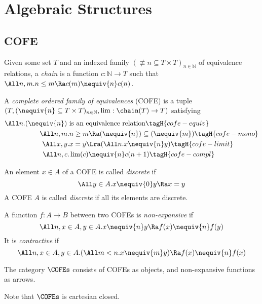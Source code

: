 \section{Algebraic Structures}

\subsection{COFE}

\begin{defn}[Chain]
  Given some set $T$ and an indexed family $({\nequiv{n}} \subseteq T \times T)_{n \in \mathbb{N}}$ of equivalence relations, a \emph{chain} is a function $c : \mathbb{N} \to T$ such that $\All n, m. n \leq m \Ra c (m) \nequiv{n} c (n)$.
\end{defn}

\begin{defn}
  A \emph{complete ordered family of equivalences} (COFE) is a tuple $(T, ({\nequiv{n}} \subseteq T \times T)_{n \in \mathbb{N}}, \lim : \chain(T) \to T)$ satisfying
  \begin{align*}
    \All n. (\nequiv{n}) ~& \text{is an equivalence relation} \tagH{cofe-equiv} \\
    \All n, m.& n \geq m \Ra (\nequiv{n}) \subseteq (\nequiv{m}) \tagH{cofe-mono} \\
    \All x, y.& x = y \Lra (\All n. x \nequiv{n} y) \tagH{cofe-limit} \\
    \All n, c.& \lim(c) \nequiv{n} c(n+1) \tagH{cofe-compl}
  \end{align*}
\end{defn}


\begin{defn}
  An element $x \in A$ of a COFE is called \emph{discrete} if
  \[ \All y \in A. x \nequiv{0} y \Ra x = y\]
  A COFE $A$ is called \emph{discrete} if all its elements are discrete.
\end{defn}

\begin{defn}
  A function $f : A \to B$ between two COFEs is \emph{non-expansive} if
  \[\All n, x \in A, y \in A. x \nequiv{n} y \Ra f(x) \nequiv{n} f(y) \]
  It is \emph{contractive} if
  \[ \All n, x \in A, y \in A. (\All m < n. x \nequiv{m} y) \Ra f(x) \nequiv{n} f(x) \]
\end{defn}

\begin{defn}
  The category $\COFEs$ consists of COFEs as objects, and non-expansive functions as arrows.
\end{defn}
Note that $\COFEs$ is cartesian closed.

